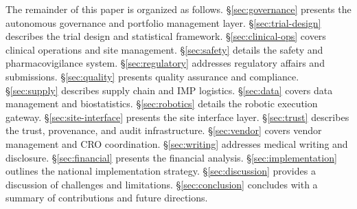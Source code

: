The remainder of this paper is organized as follows. \S\ref{sec:governance} presents the
autonomous governance and portfolio management layer. \S\ref{sec:trial-design} describes the
trial design and statistical framework. \S\ref{sec:clinical-ops} covers clinical operations
and site management. \S\ref{sec:safety} details the safety and pharmacovigilance system.
\S\ref{sec:regulatory} addresses regulatory affairs and submissions. \S\ref{sec:quality}
presents quality assurance and compliance. \S\ref{sec:supply} describes supply chain and IMP
logistics. \S\ref{sec:data} covers data management and biostatistics.
\S\ref{sec:robotics} details the robotic execution gateway. \S\ref{sec:site-interface}
presents the site interface layer. \S\ref{sec:trust} describes the trust, provenance, and
audit infrastructure. \S\ref{sec:vendor} covers vendor management and CRO coordination.
\S\ref{sec:writing} addresses medical writing and disclosure. \S\ref{sec:financial} presents
the financial analysis. \S\ref{sec:implementation} outlines the national implementation
strategy. \S\ref{sec:discussion} provides a discussion of challenges and limitations.
\S\ref{sec:conclusion} concludes with a summary of contributions and future directions.
